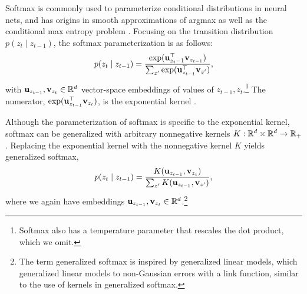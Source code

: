 \documentclass{article}
\begin{document}
Softmax is commonly used to parameterize conditional distributions in
neural nets, and has origins in smooth
approximations of argmax as well as the conditional max entropy problem \citep{}.
Focusing on the transition distribution $p(z_t \mid z_{t-1})$,
the softmax parameterization is as follows: 
\begin{equation*}
p(z_t \mid z_{t-1}) = \frac{\exp(\mathbf{u}_{z_t-1}^\top \mathbf{v}_{z_{t-1}})}
{\sum_{z'} \exp(\mathbf{u}_{z_{t-1}}^\top \mathbf{v}_{z'})},
\end{equation*}
with $\mathbf{u}_{z_{t-1}},\mathbf{v}_{z_t}\in\mathbb{R}^d$ vector-space embeddings of values of
$z_{t-1},z_{t}$.\footnote{
Softmax also has a temperature parameter that rescales 
the dot product, which we omit.
}
The numerator, $\exp(\mathbf{u}_{z_{t-1}}^\top \mathbf{v}_{z_t})$,
is the exponential kernel \citep{rawat2019sampledsoftmax}.

Although the parameterization of softmax is specific to the exponential kernel,
softmax can be generalized with arbitrary nonnegative kernels $K: \mathbb{R}^d\times\mathbb{R}^d\to\mathbb{R}_+$.
Replacing the exponential kernel with the nonnegative kernel $K$ yields 
generalized softmax,
\begin{equation}
\label{eqn:gensoftmax}
p(z_t \mid z_{t-1}) = \frac{K(\mathbf{u}_{z_{t-1}}, \mathbf{v}_{z_t})}{\sum_{z'} K(\mathbf{u}_{z_{t-1}}, \mathbf{v}_{z'})},
\end{equation}
where we again have embeddings $\mathbf{u}_{z_{t-1}},\mathbf{v}_{z_t}\in\mathbb{R}^d$.\footnote{
The term generalized softmax is inspired by generalized linear models,
which generalized linear models to non-Gaussian errors with a link function,
similar to the use of kernels in generalized softmax.
}
\end{document}

